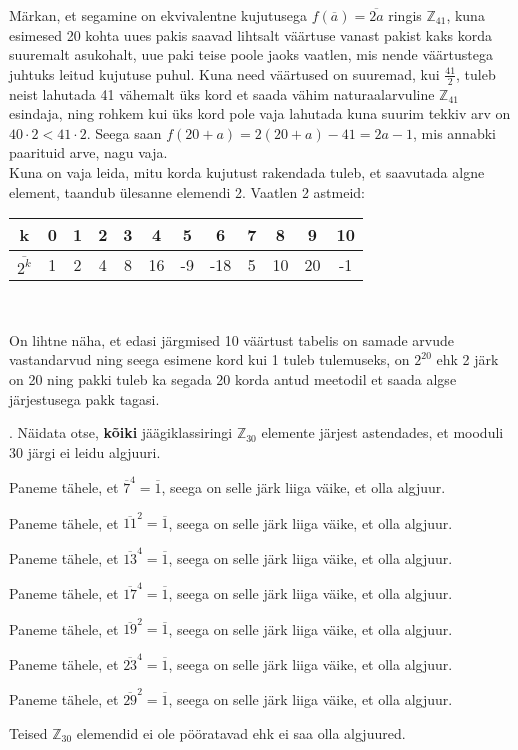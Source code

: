 \documentclass[a4paper, 10pt]{article}
\newcommand{\Z}{\mathbb{Z}}
\newcommand{\w}{\overline}
\begin{document}
\bigskip
Märkan, et segamine on ekvivalentne kujutusega $f(\w a)=\w{2a}$ ringis $\Z_{41}$, kuna esimesed 20 kohta uues pakis saavad lihtsalt väärtuse vanast pakist kaks korda suuremalt asukohalt, uue paki teise poole jaoks vaatlen, mis nende väärtustega juhtuks leitud kujutuse puhul. Kuna need väärtused on suuremad, kui $\frac{41}{2}$, tuleb neist lahutada 41 vähemalt üks kord et saada vähim naturaalarvuline $\Z_{41}$ esindaja, ning rohkem kui üks kord pole vaja lahutada kuna suurim tekkiv arv on $40\cdot2<41\cdot2$. Seega saan $f(20+a)=2(20+a)-41=2a-1$, mis annabki paarituid arve, nagu vaja.\\
Kuna on vaja leida, mitu korda kujutust rakendada tuleb, et saavutada algne element, taandub ülesanne elemendi 2. Vaatlen 2 astmeid:
\begin{center}
\begin{tabular}{c|c|c|c|c|c|c|c|c|c|c|c}
k&0&1&2&3&4&5&6&7&8&9&10\\
\hline
$\w{2^k}$&1&2&4&8&16&-9&-18&5&10&20&-1
\end{tabular}\\
\end{center}
On lihtne näha, et edasi järgmised 10 väärtust tabelis on samade arvude vastandarvud ning seega esimene kord kui 1 tuleb tulemuseks, on $2^{20}$ ehk 2 järk on 20 ning pakki tuleb ka segada 20 korda antud meetodil et saada algse järjestusega pakk tagasi.
\bigskip

. Näidata otse, {\bf kõiki} jäägiklassiringi $\mathbb{Z}_{30}$ elemente järjest astendades, et mooduli $30$ järgi ei leidu algjuuri. 

\bigskip
Paneme tähele, et  $\w{7}^{4}=\w{1}$, seega on selle järk liiga väike, et olla algjuur. 

Paneme tähele, et  $\w{11}^{2}=\w{1}$, seega on selle järk liiga väike, et olla algjuur. 

Paneme tähele, et  $\w{13}^{4}=\w{1}$, seega on selle järk liiga väike, et olla algjuur. 

Paneme tähele, et  $\w{17}^{4}=\w{1}$, seega on selle järk liiga väike, et olla algjuur. 

Paneme tähele, et  $\w{19}^{2}=\w{1}$, seega on selle järk liiga väike, et olla algjuur. 

Paneme tähele, et  $\w{23}^{4}=\w{1}$, seega on selle järk liiga väike, et olla algjuur. 

Paneme tähele, et  $\w{29}^{2}=\w{1}$, seega on selle järk liiga väike, et olla algjuur. 

Teised $\Z_{30}$ elemendid ei ole pööratavad ehk ei saa olla algjuured.
\bigskip
\pagebreak
\end{document}
